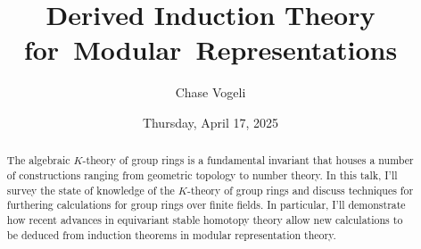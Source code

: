 \documentclass{UAmathtalk}
\author{Chase Vogeli}
\title{Derived Induction Theory for~Modular~Representations}
\date{Thursday, April 17, 2025}
\begin{document}
\maketitle

\begin{abstract}
The algebraic $K$-theory of group rings is a fundamental invariant that houses a number of constructions ranging from geometric topology to number theory. In this talk, I’ll survey the state of knowledge of the $K$-theory of group rings and discuss techniques for furthering calculations for group rings over finite fields. In particular, I’ll demonstrate how recent advances in equivariant stable homotopy theory allow new calculations to be deduced from induction theorems in modular representation theory.
\end{abstract}
\end{document}
